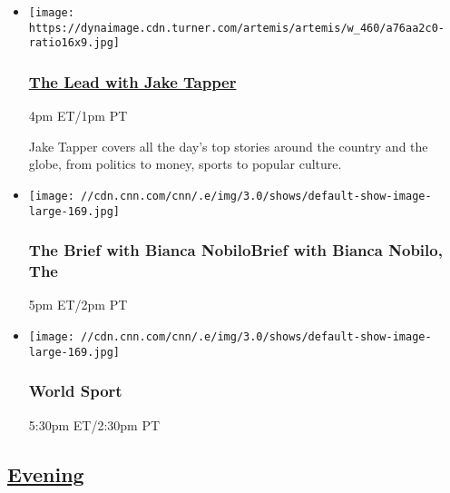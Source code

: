 \begin{itemize}
\item
  \href{/specials/tv/all-shows}{}

  \texttt{[image: https://dynaimage.cdn.turner.com/artemis/artemis/w\_460/a76aa2c0-ratio16x9.jpg]}

  \hypertarget{the-lead-with-jake-tapper}{%
  \subsubsection{\texorpdfstring{\href{/specials/tv/all-shows}{The Lead
  with Jake
  Tapper}}{The Lead with Jake Tapper}}\label{the-lead-with-jake-tapper}}

  4pm ET/1pm PT

  Jake Tapper covers all the day's top stories around the country and
  the globe, from politics to money, sports to popular culture.
\end{itemize}

\begin{itemize}
\item
  \texttt{[image: //cdn.cnn.com/cnn/.e/img/3.0/shows/default-show-image-large-169.jpg]}

  \hypertarget{the-brief-with-bianca-nobilobrief-with-bianca-nobilo-the-}{%
  \subsubsection{The Brief with Bianca NobiloBrief with Bianca Nobilo,
  The
  }\label{the-brief-with-bianca-nobilobrief-with-bianca-nobilo-the-}}

  5pm ET/2pm PT
\end{itemize}

\begin{itemize}
\item
  \texttt{[image: //cdn.cnn.com/cnn/.e/img/3.0/shows/default-show-image-large-169.jpg]}

  \hypertarget{world-sport-10}{%
  \subsubsection{World Sport}\label{world-sport-10}}

  5:30pm ET/2:30pm PT
\end{itemize}

\hypertarget{evening--2}{%
\subsection{\texorpdfstring{\href{/tv/schedule/cnn/index.html}{Evening}~}{Evening~}}\label{evening--2}}


